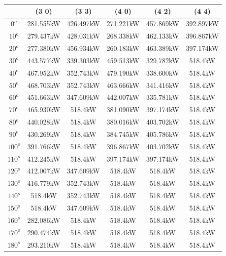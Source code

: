         \begin{table}[H]
        	\centering
        	\begin{tabular}{|c|c|c|c|c|c|} \hline
        			& (3 0)		& (3 3)		& (4 0)		& (4 2)		& (4 4)		\\ \hline
        		$0^o$	& 281.555kW	& 426.497kW	& 271.221kW	& 457.869kW	& 392.897kW	\\ \hline
        		$10^o$	& 279.437kW	& 428.031kW	& 268.338kW	& 462.133kW	& 396.867kW	\\ \hline
        		$20^o$	& 277.380kW	& 456.934kW	& 260.183kW	& 463.389kW	& 397.174kW	\\ \hline
        		$30^o$	& 443.577kW	& 339.303kW	& 459.513kW	& 329.782kW	& 518.4kW	\\ \hline
        		$40^o$	& 467.952kW	& 352.743kW	& 479.190kW	& 338.600kW	& 518.4kW	\\ \hline
        		$50^o$	& 468.703kW	& 352.743kW	& 463.666kW	& 341.416kW	& 518.4kW	\\ \hline
        		$60^o$	& 451.663kW	& 347.609kW	& 442.007kW	& 335.781kW	& 518.4kW	\\ \hline
        		$70^o$	& 465.930kW	& 518.4kW	& 381.090kW	& 397.174kW	& 518.4kW	\\ \hline
        		$80^o$	& 440.028kW	& 518.4kW	& 380.016kW	& 403.702kW	& 518.4kW	\\ \hline
        		$90^o$	& 430.269kW	& 518.4kW	& 384.745kW	& 405.786kW	& 518.4kW	\\ \hline
        		$100^o$	& 391.766kW	& 518.4kW	& 396.867kW	& 403.702kW	& 518.4kW	\\ \hline
        		$110^o$	& 412.245kW	& 518.4kW	& 397.174kW	& 397.174kW	& 518.4kW	\\ \hline
        		$120^o$	& 412.007kW	& 347.609kW	& 518.4kW	& 518.4kW	& 518.4kW	\\ \hline
        		$130^o$	& 416.779kW	& 352.743kW	& 518.4kW	& 518.4kW	& 518.4kW	\\ \hline
        		$140^o$	& 518.4kW	& 352.743kW	& 518.4kW	& 518.4kW	& 518.4kW	\\ \hline
        		$150^o$	& 518.4kW	& 347.609kW	& 518.4kW	& 518.4kW	& 518.4kW	\\ \hline
        		$160^o$	& 282.086kW	& 518.4kW	& 518.4kW	& 518.4kW	& 518.4kW	\\ \hline
        		$170^o$	& 290.474kW	& 518.4kW	& 518.4kW	& 518.4kW	& 518.4kW	\\ \hline
        		$180^o$	& 293.210kW	& 518.4kW	& 518.4kW	& 518.4kW	& 518.4kW	\\ \hline

\end{tabular}
\end{table}
